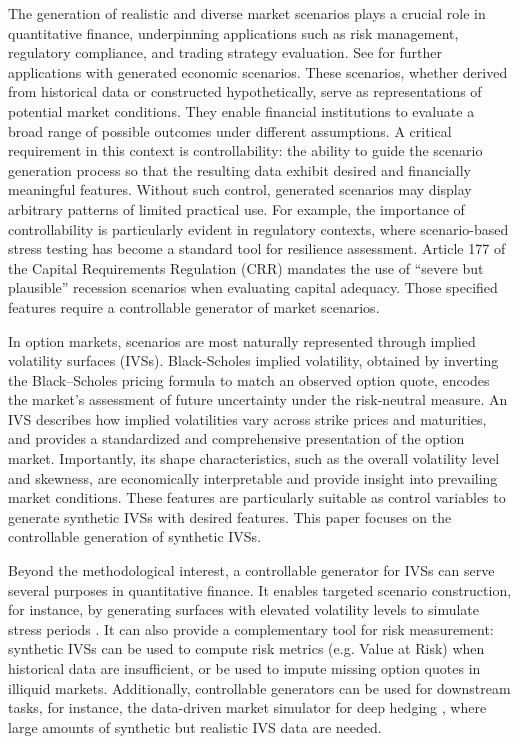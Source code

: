 \documentclass{article}
\begin{document}
The generation of realistic and diverse market scenarios plays a crucial role in quantitative finance, underpinning applications such as risk management, regulatory compliance, and trading strategy evaluation. See \citep{SOA2016ESG} for further  applications with generated economic scenarios.  These scenarios, whether derived from historical data or constructed hypothetically, serve as  representations of potential market conditions. They enable financial institutions to evaluate a broad range of possible outcomes under different assumptions. A critical requirement in this context is controllability: the ability to guide the scenario generation process so that the resulting  data exhibit desired and financially meaningful features. Without such control, generated scenarios may display arbitrary patterns of limited practical use.  For example, the importance of controllability is particularly evident in regulatory contexts, where scenario-based stress testing has become a standard tool for resilience assessment. Article 177 of the Capital Requirements Regulation (CRR) \citep{EUReg2013CRR} mandates the use of “severe but plausible” recession scenarios when evaluating capital adequacy. Those specified features require a controllable generator of  market scenarios. 



In option markets, scenarios are most naturally represented through implied volatility surfaces (IVSs). Black-Scholes implied volatility, obtained by inverting the Black–Scholes pricing formula to match an observed option quote, encodes the market’s assessment of future uncertainty under the risk-neutral measure.  An IVS describes how implied volatilities vary across strike prices and maturities, and  provides a standardized and comprehensive presentation of the option market. Importantly, its shape characteristics, such as the overall volatility level and skewness, are economically interpretable and provide insight into prevailing market conditions. These features are particularly suitable as control variables to generate synthetic IVSs with desired features. This paper focuses on the controllable generation of synthetic IVSs.


Beyond the methodological interest, a controllable generator for IVSs can serve several purposes in quantitative finance. It enables targeted scenario construction, for instance,  by generating surfaces with elevated volatility levels to simulate stress periods \citep{malz2001financial}. It can also provide a complementary tool for risk measurement: synthetic IVSs can be used to compute risk metrics (e.g. Value at Risk) when historical data are insufficient, or be used to impute missing option quotes in illiquid markets.  Additionally, controllable generators can be used for downstream tasks, for instance,  the data-driven market simulator for deep hedging \citep{buehler2019deep},  where large amounts of synthetic but realistic IVS data are needed.
\end{document}
